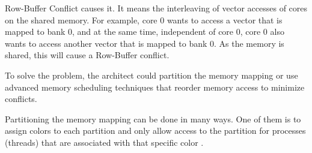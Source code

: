 \documentclass[12pt]{article}
\begin{document}
\begin{enumerate}[label=\alph*.]
Row-Buffer Conflict causes it. It means the interleaving of vector accesses of cores on the shared memory. For example, core 0 wants to access a vector that is mapped to bank 0, and at the same time, independent of core 0, core 0 also wants to access another vector that is mapped to bank 0. As the memory is shared, this will cause a Row-Buffer conflict.


To solve the problem, the architect could partition the memory mapping or use advanced memory scheduling techniques that reorder memory access to minimize conflicts.

Partitioning the memory mapping can be done in many ways. One of them is to assign colors to each partition and only allow access to the partition for processes (threads) that are associated with that specific color \cite{AhrenInvestigatingDB}.
\end{enumerate}


\nocite{*}



\end{document}
